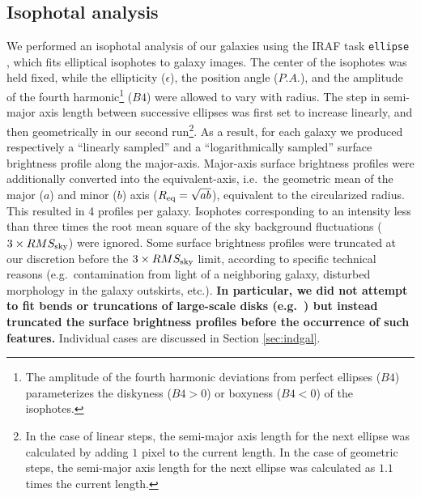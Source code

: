 \documentclass[preprint2]{emulateapj}
\begin{document}
\subsection{Isophotal analysis}
We performed an isophotal analysis of our galaxies using the IRAF task {\tt ellipse} \citep{taskellipse}, 
which fits elliptical isophotes to galaxy images.
The center of the isophotes was held fixed, while the ellipticity ($\epsilon$), the position angle ($P.A.$),  
and the amplitude of the fourth harmonic\footnote{The amplitude of the fourth harmonic deviations from perfect ellipses 
($B4$) parameterizes the diskyness ($B4>0$) or boxyness ($B4<0$) of the isophotes.} ($B4$) were allowed to vary with radius.
The step in semi-major axis length between successive ellipses was first set to increase linearly, 
and then geometrically in our second run\footnote{In the case of linear steps, 
the semi-major axis length for the next ellipse was calculated by adding $1$ pixel to the current length.
In the case of geometric steps, the semi-major axis length for the next ellipse 
was calculated as $1.1$ times the current length.}.
As a result, for each galaxy we produced respectively a ``linearly sampled'' and a ``logarithmically sampled'' 
surface brightness profile along the major-axis. 
Major-axis surface brightness profiles were additionally converted into the equivalent-axis,
i.e.~the geometric mean of the major ($a$) and minor ($b$) axis ($R_{\rm eq} = \sqrt{ab}$), 
equivalent to the circularized radius.
This resulted in 4 profiles per galaxy.
Isophotes corresponding to an intensity less than 
three times the root mean square of the sky background fluctuations ($3 \times RMS_{\rm sky}$) were ignored.
Some surface brightness profiles were truncated at our discretion before the $3 \times RMS_{\rm sky}$ limit, 
according to specific technical reasons (e.g.~contamination from light of a neighboring galaxy, 
disturbed morphology in the galaxy outskirts, etc.). 
{\bf In particular, we did not attempt to fit bends or truncations of large-scale disks 
(e.g.~\citealt{erwin2005,erwin2008,erwin2012,gutierrez2011,comeron2012,munozmateos2013,kim2014}) 
but instead truncated the surface brightness profiles before the occurrence of such features. }
Individual cases are discussed in Section \ref{sec:indgal}.
\end{document}

